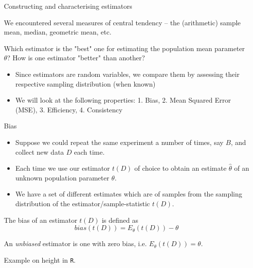 \documentclass{beamer}
\begin{document}
\begin{frame}{Constructing and characterising estimators}

	We encountered several measures of central tendency – the (arithmetic) sample mean, median, geometric mean, etc.

	\begin{block}{}
	Which estimator is the "best" one for estimating the population mean parameter $\theta$? 
	How is one estimator "better" than another?
	\end{block}

	\pause

	\begin{itemize}
		\item Since estimators are random variables, we compare them by assessing their
		respective sampling distribution (when known)
		\item We will look at the following properties: 1. Bias, 2. Mean Squared
		Error (MSE), 3. Efficiency, 4. Consistency
	\end{itemize}

\end{frame}

\begin{frame}{Bias}

	\begin{itemize}
		\item Suppose we could repeat the same experiment a number of times, say $B$, and collect new data $D$ each time.
		\item Each time we use our estimator $t(D)$ of choice to obtain an estimate $\hat{\theta}$ of an unknown 
	population parameter $\theta$.
		\item We have a set of different estimates which are of samples from the sampling distribution of the
	estimator/sample-statistic $t(D)$.
	\end{itemize}

	\pause
	
	The bias of an estimator $t(D)$ is defined as
	\begin{equation*}
		bias(t(D)) = E_\theta(t(D)) - \theta
	\end{equation*}

	An \textit{unbiased} estimator is one with zero bias, i.e. $E_\theta(t(D)) = \theta$.

	\tiny{Example on height in \texttt{R}.}
	
\end{frame}
\end{document}
